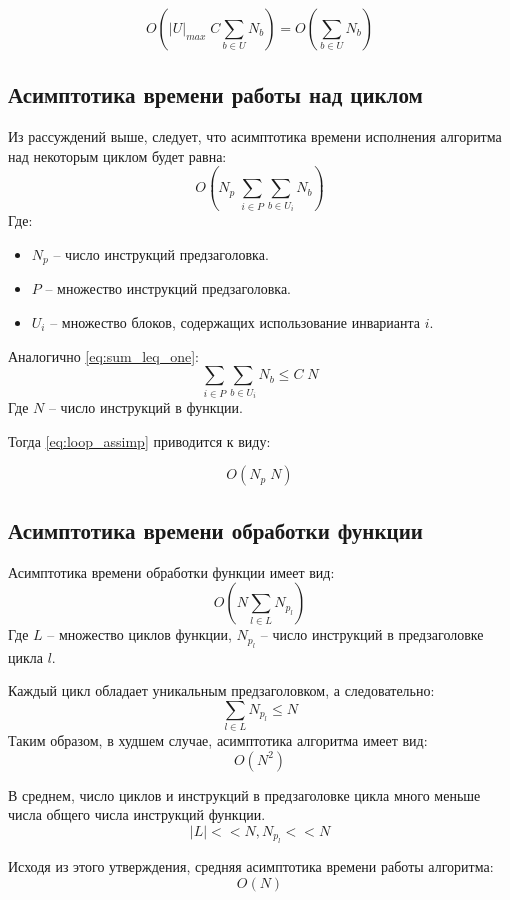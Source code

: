 $$ O(|U|_{max} \; C \sum_{b \in U} N_b) = O(\sum_{b \in U} N_b) $$

\subsection{Асимптотика времени работы над циклом}

Из рассуждений выше, следует, что асимптотика времени исполнения алгоритма над некоторым циклом будет равна:
\begin{equation} \label{eq:loop_assimp}
O(N_p \; \sum_{i \in P} {\sum_{b \in U_i} N_b})
\end{equation}
Где:
\begin{itemize}
    \item $N_p$ -- число инструкций предзаголовка.
    \item $P$ -- множество инструкций предзаголовка.
    \item $U_i$ -- множество блоков, содержащих использование инварианта $i$.
\end{itemize}

Аналогично \ref{eq:sum_leq_one}:
$$ \sum_{i \in P} {\sum_{b \in U_i} N_b} \leq C \; N $$
Где $N$ -- число инструкций в функции.

Тогда \ref{eq:loop_assimp} приводится к виду:

$$ O(N_p \; N) $$

\subsection{Асимптотика времени обработки функции}

Асимптотика времени обработки функции имеет вид:
\begin{equation} \label{eq:assimp}
O(N \sum_{l \in L} N_{p_l})
\end{equation}
Где $L$ -- множество циклов функции, $N_{p_l}$ -- число инструкций в предзаголовке цикла $l$.

Каждый цикл обладает уникальным предзаголовком, а следовательно:
$$ \sum_{l \in L} N_{p_l} \leq N $$
Таким образом, в худшем случае, асимптотика алгоритма имеет вид:
\begin{equation} \label{eq:assimp_worst}
O(N^2)
\end{equation}

В среднем, число циклов и инструкций в предзаголовке цикла много меньше числа общего числа инструкций функции.
$$ |L| << N, N_{p_l} << N $$

Исходя из этого утверждения, средняя асимптотика времени работы алгоритма:
\begin{equation} \label{eq:assimp_worst}
O(N)
\end{equation}

